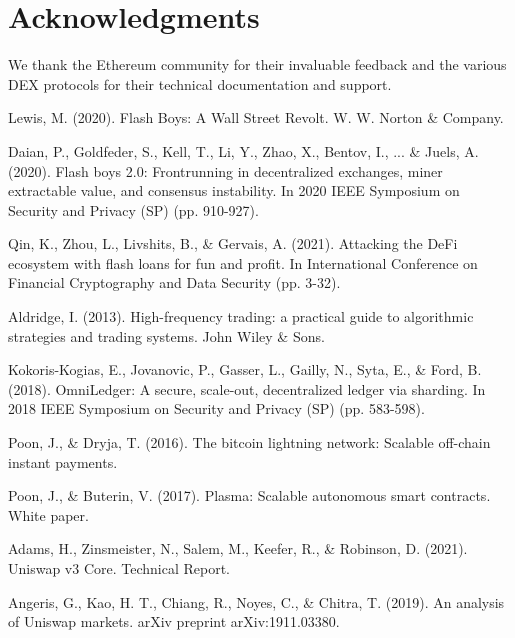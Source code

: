 \documentclass[12pt]{article}
\begin{document}
\section{Acknowledgments}

We thank the Ethereum community for their invaluable feedback and the various DEX protocols for their technical documentation and support.


\begin{thebibliography}{9}

Lewis, M. (2020). Flash Boys: A Wall Street Revolt. W. W. Norton \& Company.

Daian, P., Goldfeder, S., Kell, T., Li, Y., Zhao, X., Bentov, I., ... \& Juels, A. (2020). Flash boys 2.0: Frontrunning in decentralized exchanges, miner extractable value, and consensus instability. In 2020 IEEE Symposium on Security and Privacy (SP) (pp. 910-927).

Qin, K., Zhou, L., Livshits, B., \& Gervais, A. (2021). Attacking the DeFi ecosystem with flash loans for fun and profit. In International Conference on Financial Cryptography and Data Security (pp. 3-32).

Aldridge, I. (2013). High-frequency trading: a practical guide to algorithmic strategies and trading systems. John Wiley \& Sons.

Kokoris-Kogias, E., Jovanovic, P., Gasser, L., Gailly, N., Syta, E., \& Ford, B. (2018). OmniLedger: A secure, scale-out, decentralized ledger via sharding. In 2018 IEEE Symposium on Security and Privacy (SP) (pp. 583-598).

Poon, J., \& Dryja, T. (2016). The bitcoin lightning network: Scalable off-chain instant payments.

Poon, J., \& Buterin, V. (2017). Plasma: Scalable autonomous smart contracts. White paper.

Adams, H., Zinsmeister, N., Salem, M., Keefer, R., \& Robinson, D. (2021). Uniswap v3 Core. Technical Report.

Angeris, G., Kao, H. T., Chiang, R., Noyes, C., \& Chitra, T. (2019). An analysis of Uniswap markets. arXiv preprint arXiv:1911.03380.

\end{thebibliography}

\appendix
\end{document}
